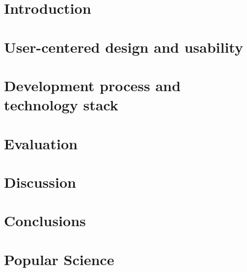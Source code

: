 \documentclass[nofilelist,dvipsnames]{cslthse-msc}
\begin{document}



\tableofcontents

\chapter{Introduction}

  

\chapter{User-centered design and usability}

  

\chapter{Development process and technology stack}

  

\chapter{Evaluation}

  

\chapter{Discussion}

  

\chapter{Conclusions}

  

\chapter{Popular Science}

  

%
%
%  
\end{document}
